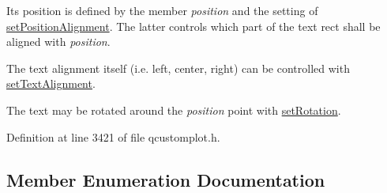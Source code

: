  Its position is defined by the member {\itshape position} and the setting of \hyperlink{class_q_c_p_item_text_a781cdf8c640fc6a055dcff1e675c8c7a}{set\+Position\+Alignment}. The latter controls which part of the text rect shall be aligned with {\itshape position}.

The text alignment itself (i.\+e. left, center, right) can be controlled with \hyperlink{class_q_c_p_item_text_ab5bc0684c4d1bed81949a11b34dba478}{set\+Text\+Alignment}.

The text may be rotated around the {\itshape position} point with \hyperlink{class_q_c_p_item_text_a4bcc10cd97952c3f749d75824b5077f0}{set\+Rotation}. 

Definition at line 3421 of file qcustomplot.\+h.



\subsection{Member Enumeration Documentation}
\hypertarget{class_q_c_p_item_text_a14a84e58f72519c8ae1d7a4a1dd23f21}{}
